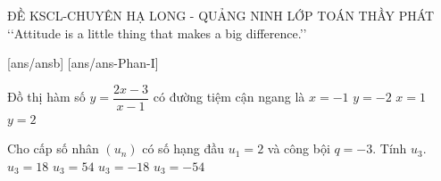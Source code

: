 \begin{name}
	{\tenchude}
	{ĐỀ KSCL-CHUYÊN HẠ LONG - QUẢNG NINH}
	{LỚP TOÁN THẦY PHÁT}
	{\lq\lq  Attitude is a little thing that makes a big difference.\rq\rq}
\end{name}
[ans/ansb\currfilebase]
\caulc
{}[ans/ans\currfilebase-Phan-I]
\begin{ex}%
	Đồ thị hàm số $y=\dfrac{2x-3}{x-1}$ có đường tiệm cận ngang là
	\choice
	{$x=-1$}
	{$y=-2$}
	{$x=1$}
	{\True $y=2$}
\end{ex}

\begin{ex}%
	Cho cấp số nhân $(u_n)$ có số hạng đầu $u_1=2$ và công bội $q=-3$. Tính $u_3$.
	\choice
	{\True $u_3=18$}
	{$u_3=54$}
	{$u_3=-18$}
	{$u_3=-54$}
\end{ex}

